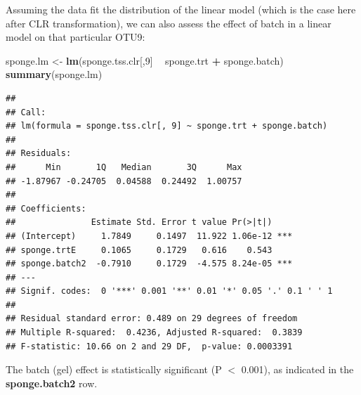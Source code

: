 \documentclass[]{book}
\newenvironment{Shaded}{\begin{snugshade}}{\end{snugshade}}
\newcommand{\KeywordTok}[1]{\textcolor[rgb]{0.13,0.29,0.53}{\textbf{#1}}}
\newcommand{\DataTypeTok}[1]{\textcolor[rgb]{0.13,0.29,0.53}{#1}}
\newcommand{\DecValTok}[1]{\textcolor[rgb]{0.00,0.00,0.81}{#1}}
\newcommand{\StringTok}[1]{\textcolor[rgb]{0.31,0.60,0.02}{#1}}
\newcommand{\CommentTok}[1]{\textcolor[rgb]{0.56,0.35,0.01}{\textit{#1}}}
\newcommand{\OperatorTok}[1]{\textcolor[rgb]{0.81,0.36,0.00}{\textbf{#1}}}
\newcommand{\NormalTok}[1]{#1}
\begin{document}
Assuming the data fit the distribution of the linear model (which is the
case here after CLR transformation), we can also assess the effect of
batch in a linear model on that particular OTU9:

\begin{Shaded}
\begin{Highlighting}[]
\NormalTok{sponge.lm <-}\StringTok{ }\KeywordTok{lm}\NormalTok{(sponge.tss.clr[,}\DecValTok{9}\NormalTok{] }\OperatorTok{~}\StringTok{ }\NormalTok{sponge.trt }\OperatorTok{+}\StringTok{ }\NormalTok{sponge.batch)}
\KeywordTok{summary}\NormalTok{(sponge.lm)}
\end{Highlighting}
\end{Shaded}

\begin{verbatim}
## 
## Call:
## lm(formula = sponge.tss.clr[, 9] ~ sponge.trt + sponge.batch)
## 
## Residuals:
##      Min       1Q   Median       3Q      Max 
## -1.87967 -0.24705  0.04588  0.24492  1.00757 
## 
## Coefficients:
##               Estimate Std. Error t value Pr(>|t|)    
## (Intercept)     1.7849     0.1497  11.922 1.06e-12 ***
## sponge.trtE     0.1065     0.1729   0.616    0.543    
## sponge.batch2  -0.7910     0.1729  -4.575 8.24e-05 ***
## ---
## Signif. codes:  0 '***' 0.001 '**' 0.01 '*' 0.05 '.' 0.1 ' ' 1
## 
## Residual standard error: 0.489 on 29 degrees of freedom
## Multiple R-squared:  0.4236, Adjusted R-squared:  0.3839 
## F-statistic: 10.66 on 2 and 29 DF,  p-value: 0.0003391
\end{verbatim}

The batch (gel) effect is statistically significant (P \(<\) 0.001), as
indicated in the \textbf{sponge.batch2} row.

\begin{Shaded}
\end{Shaded}
\end{document}
